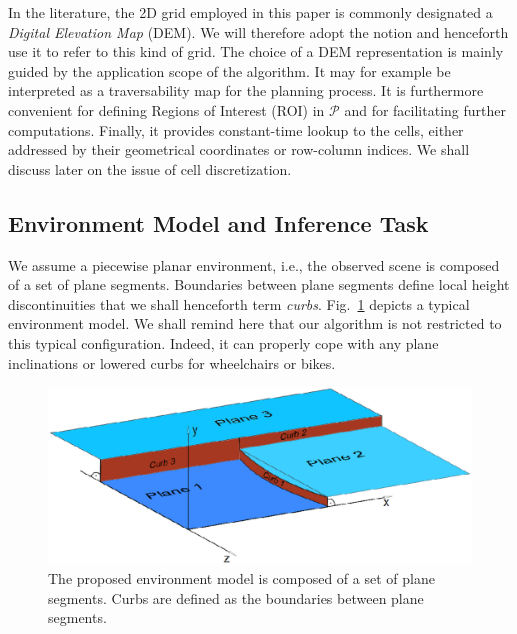 In the literature, the 2D grid employed in this paper is commonly designated a
\emph{Digital Elevation Map} (DEM). We will therefore adopt the notion and
henceforth use it to refer to this kind of grid. The choice of a DEM
representation is mainly guided by the application scope of the algorithm. It
may for example be interpreted as a traversability map for the planning process.
It is furthermore convenient for defining Regions of Interest (ROI) in
$\mathcal{P}$ and for facilitating further computations. Finally, it provides
constant-time lookup to the cells, either addressed by their geometrical
coordinates or row-column indices. We shall discuss later on the issue of
cell discretization.



\subsection{Environment Model and Inference Task}

We assume a piecewise planar environment, i.e., the observed scene is composed
of a set of plane segments. Boundaries between plane segments define local
height discontinuities that we shall henceforth term \emph{curbs}.
Fig.~\ref{fig:model} depicts a typical environment model. We shall remind here
that our algorithm is not restricted to this typical configuration. Indeed, it
can properly cope with any plane inclinations or lowered curbs for wheelchairs
or bikes.

\begin{figure}[t]
\centering
\includegraphics[width=\columnwidth]{fig/model.eps}
\caption{The proposed environment model is composed of a set of plane segments.
Curbs are defined as the boundaries between plane segments.}
\label{fig:model}
\end{figure}


